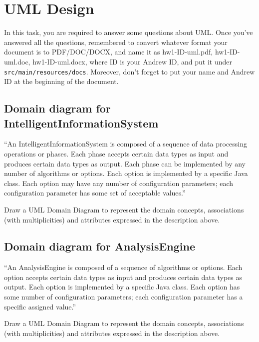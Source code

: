 
\chapter{UML Design}

In this task, you are required to answer some questions about UML. Once you've
answered all the questions, remembered to convert whatever format your document
is to PDF/DOC/DOCX, and name it as hw1-ID-uml.pdf, hw1-ID-uml.doc,
hw1-ID-uml.docx, where ID is your Andrew ID, and put it under
\texttt{src/main/resources/docs}. Moreover, don't forget to put your name and
Andrew ID at the beginning of the document.

\section{Domain diagram for IntelligentInformationSystem}

``An IntelligentInformationSystem is composed of a sequence of data processing
operations or phases. Each phase accepts certain data types as input and
produces certain data types as output. Each phase can be implemented by any
number of algorithms or options. Each option is implemented by a specific Java
class. Each option may have any number of configuration parameters; each
configuration parameter has some set of acceptable values.''

Draw a UML Domain Diagram to represent the domain concepts, associations (with
multiplicities) and attributes expressed in the description above.

\section{Domain diagram for AnalysisEngine}

``An AnalysisEngine is composed of a sequence of algorithms or options. Each
option accepts certain data types as input and produces certain data types as
output. Each option is implemented by a specific Java class. Each option has
some number of configuration parameters; each configuration parameter has a
specific assigned value.''

Draw a UML Domain Diagram to represent the domain concepts, associations (with
multiplicities) and attributes expressed in the description above.

%
%

